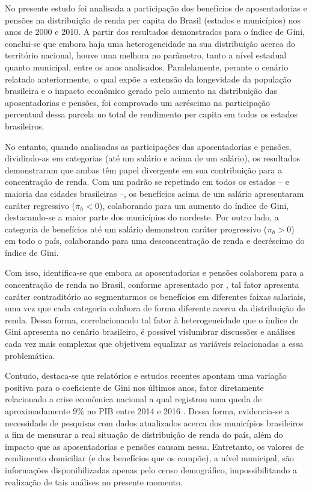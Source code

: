 No presente estudo foi analisada a participação dos benefícios de aposentadorias e pensões na distribuição de renda per capita do Brasil (estados e municípios) nos anos de 2000 e 2010. A partir dos resultados demonstrados para o índice de Gini, conclui-se que embora haja uma heterogeneidade na sua distribuição acerca do território nacional, houve uma melhora no parâmetro, tanto a nível estadual quanto municipal, entre os anos analisados. Paralelamente, perante o cenário relatado anteriormente, o qual expõe a extensão da longevidade da população brasileira e o impacto econômico gerado pelo aumento na distribuição das aposentadorias e pensões, foi comprovado um acréscimo na participação percentual dessa parcela no total de rendimento per capita em todos os estados brasileiros.

No entanto, quando analisadas as participações das aposentadorias e pensões, dividindo-as em categorias (até um salário e acima de um salário), os resultados demonstraram que ambas têm papel divergente em sua contribuição para a concentração de renda. Com um padrão se repetindo em todos os estados – e maioria das cidades brasileiras –, os benefícios acima de um salário apresentaram caráter regressivo ($ \pi_h < 0$), colaborando para um aumento do índice de Gini, destacando-se a maior parte dos municípios do nordeste. Por outro lado, a categoria de benefícios até um salário demonstrou caráter progressivo ($\pi_h > 0$) em todo o país, colaborando para uma desconcentração de renda e decréscimo do índice de Gini.  

Com isso, identifica-se que embora as aposentadorias e pensões colaborem para a concentração de renda no Brasil, conforme apresentado por \cite{cap04_ref7, cap04_ref8, cap04_ref9} , tal fator apresenta caráter contraditório ao segmentarmos os benefícios em diferentes faixas salariais, uma vez que cada categoria colabora de forma diferente acerca da distribuição de renda. Dessa forma, correlacionando tal fator à heterogeneidade que o índice de Gini apresenta no cenário brasileiro, é possível vislumbrar discussões e análises cada vez mais complexas que objetivem equalizar as variáveis relacionadas a essa problemática.

Contudo, destaca-se que relatórios e estudos recentes apontam uma variação positiva para o coeficiente de Gini nos últimos anos, fator diretamente relacionado a crise econômica nacional a qual registrou uma queda de aproximadamente 9\% no PIB entre 2014 e 2016 \cite{cap04_ref19}. Dessa forma, evidencia-se a necessidade de pesquisas com dados atualizados acerca dos municípios brasileiros a fim de mensurar a real situação de distribuição de renda do país, além do impacto que as aposentadorias e pensões causam nessa. Entretanto, os valores de rendimento domiciliar (e dos benefícios que os compõe), a nível municipal, são informações disponibilizadas apenas pelo censo demográfico, impossibilitando a realização de tais análises no presente momento.

